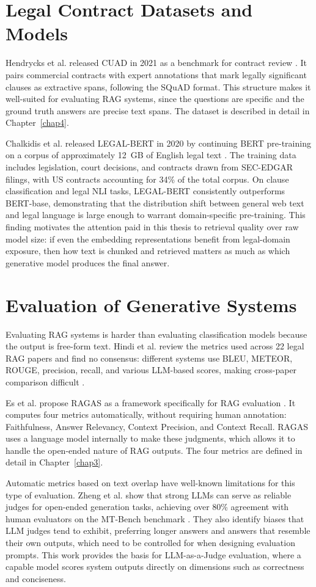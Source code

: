\section{Legal Contract Datasets and Models}
Hendrycks et al. released CUAD in 2021 as a benchmark for contract review \cite{hendrycks2021cuad}. It pairs commercial contracts with expert annotations that mark legally significant clauses as extractive spans, following the SQuAD format. This structure makes it well-suited for evaluating RAG systems, since the questions are specific and the ground truth answers are precise text spans. The dataset is described in detail in Chapter~\ref{chap4}.

Chalkidis et al. released LEGAL-BERT in 2020 by continuing BERT pre-training on a corpus of approximately 12~GB of English legal text \cite{chalkidis2020legalbert}. The training data includes legislation, court decisions, and contracts drawn from SEC-EDGAR filings, with US contracts accounting for 34\% of the total corpus. On clause classification and legal NLI tasks, LEGAL-BERT consistently outperforms BERT-base, demonstrating that the distribution shift between general web text and legal language is large enough to warrant domain-specific pre-training. This finding motivates the attention paid in this thesis to retrieval quality over raw model size: if even the embedding representations benefit from legal-domain exposure, then how text is chunked and retrieved matters as much as which generative model produces the final answer.

\section{Evaluation of Generative Systems}
Evaluating RAG systems is harder than evaluating classification models because the output is free-form text. Hindi et al. review the metrics used across 22 legal RAG papers and find no consensus: different systems use BLEU, METEOR, ROUGE, precision, recall, and various LLM-based scores, making cross-paper comparison difficult \cite{hindi2024ragsurvey}.

Es et al. propose RAGAS as a framework specifically for RAG evaluation \cite{es2024ragas}. It computes four metrics automatically, without requiring human annotation: Faithfulness, Answer Relevancy, Context Precision, and Context Recall. RAGAS uses a language model internally to make these judgments, which allows it to handle the open-ended nature of RAG outputs. The four metrics are defined in detail in Chapter~\ref{chap3}.

Automatic metrics based on text overlap have well-known limitations for this type of evaluation. Zheng et al. show that strong LLMs can serve as reliable judges for open-ended generation tasks, achieving over 80\% agreement with human evaluators on the MT-Bench benchmark \cite{zheng2023judging}. They also identify biases that LLM judges tend to exhibit, preferring longer answers and answers that resemble their own outputs, which need to be controlled for when designing evaluation prompts. This work provides the basis for LLM-as-a-Judge evaluation, where a capable model scores system outputs directly on dimensions such as correctness and conciseness.


